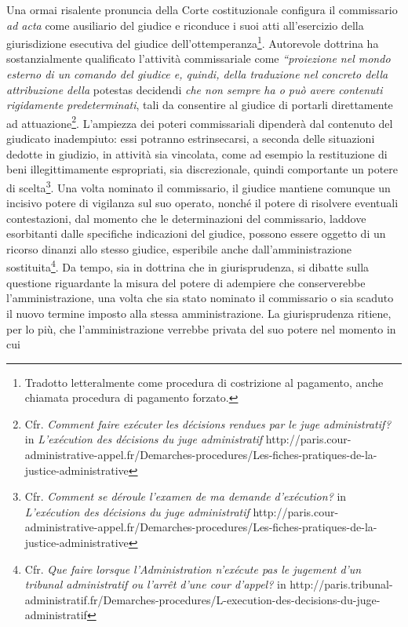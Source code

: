 \documentclass[12pt,it,a4paper,]{report}
\begin{document}
Una ormai risalente pronuncia della Corte costituzionale configura il
commissario \emph{ad acta} come ausiliario del giudice e riconduce i
suoi atti all'esercizio della giurisdizione esecutiva del giudice
dell'ottemperanza\footnote{Tradotto letteralmente come procedura di
  costrizione al pagamento, anche chiamata procedura di pagamento
  forzato.}. Autorevole dottrina ha sostanzialmente qualificato
l'attività commissariale come \emph{``proiezione nel mondo esterno di un
comando del giudice e, quindi, della traduzione nel concreto della
attribuzione della} potestas decidendi \emph{che non sempre ha o può
avere contenuti rigidamente predeterminati}, tali da consentire al
giudice di portarli direttamente ad attuazione\footnote{Cfr.
  \emph{Comment faire exécuter les décisions rendues par le juge
  administratif?} in \emph{L'exécution des décisions du juge
  administratif}
  http://paris.cour-administrative-appel.fr/Demarches-procedures/Les-fiches-pratiques-de-la-justice-administrative}.
L'ampiezza dei poteri commissariali dipenderà dal contenuto del
giudicato inadempiuto: essi potranno estrinsecarsi, a seconda delle
situazioni dedotte in giudizio, in attività sia vincolata, come ad
esempio la restituzione di beni illegittimamente espropriati, sia
discrezionale, quindi comportante un potere di scelta\footnote{Cfr.
  \emph{Comment se déroule l'examen de ma demande d'exécution?} in
  \emph{L'exécution des décisions du juge administratif}
  http://paris.cour-administrative-appel.fr/Demarches-procedures/Les-fiches-pratiques-de-la-justice-administrative}.
Una volta nominato il commissario, il giudice mantiene comunque un
incisivo potere di vigilanza sul suo operato, nonché il potere di
risolvere eventuali contestazioni, dal momento che le determinazioni del
commissario, laddove esorbitanti dalle specifiche indicazioni del
giudice, possono essere oggetto di un ricorso dinanzi allo stesso
giudice, esperibile anche dall'amministrazione sostituita\footnote{Cfr.
  \emph{Que faire lorsque l'Administration n'exécute pas le jugement
  d'un tribunal administratif ou l'arrêt d'une cour d'appel?} in
  http://paris.tribunal-administratif.fr/Demarches-procedures/L-execution-des-decisions-du-juge-administratif}.
Da tempo, sia in dottrina che in giurisprudenza, si dibatte sulla
questione riguardante la misura del potere di adempiere che
conserverebbe l'amministrazione, una volta che sia stato nominato il
commissario o sia scaduto il nuovo termine imposto alla stessa
amministrazione. La giurisprudenza ritiene, per lo più, che
l'amministrazione verrebbe privata del suo potere nel momento in cui
\end{document}
